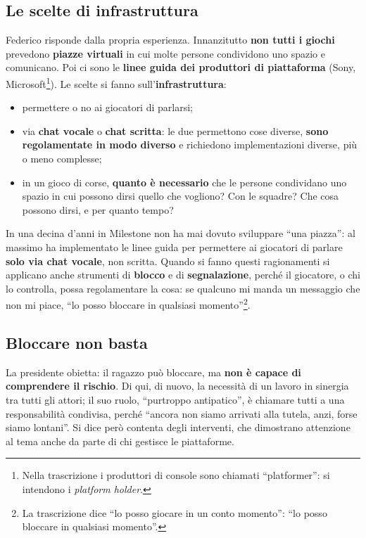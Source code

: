 \subsection{Le scelte di infrastruttura}

Federico risponde dalla propria esperienza. Innanzitutto \textbf{non tutti i
giochi} prevedono \textbf{piazze virtuali} in cui molte persone condividono uno
spazio e comunicano. Poi ci sono le \textbf{linee guida dei produttori di
piattaforma} (Sony, Microsoft\footnote{Nella trascrizione i produttori di
console sono chiamati ``platformer'': si intendono i \emph{platform holder}.}).
Le scelte si fanno sull'\textbf{infrastruttura}:
\begin{itemize}
  \item permettere o no ai giocatori di parlarsi;
  \item via \textbf{chat vocale} o \textbf{chat scritta}: le due permettono cose
        diverse, \textbf{sono regolamentate in modo diverso} e richiedono
        implementazioni diverse, più o meno complesse;
  \item in un gioco di corse, \textbf{quanto è necessario} che le persone
        condividano uno spazio in cui possono dirsi quello che vogliono? Con le
        squadre? Che cosa possono dirsi, e per quanto tempo?
\end{itemize}
In una decina d'anni in Milestone non ha mai dovuto sviluppare ``una piazza'':
al massimo ha implementato le linee guida per permettere ai giocatori di
parlare \textbf{solo via chat vocale}, non scritta. Quando si fanno questi
ragionamenti si applicano anche strumenti di \textbf{blocco} e di
\textbf{segnalazione}, perché il giocatore, o chi lo controlla, possa
regolamentare la cosa: se qualcuno mi manda un messaggio che non mi piace,
``lo posso bloccare in qualsiasi momento''\footnote{La trascrizione dice ``lo
posso giocare in un conto momento'': ``lo posso bloccare in qualsiasi
momento''.}.

\subsection{Bloccare non basta}

La presidente obietta: il ragazzo può bloccare, ma \textbf{non è capace di
comprendere il rischio}. Di qui, di nuovo, la necessità di un lavoro in sinergia
tra tutti gli attori; il suo ruolo, ``purtroppo antipatico'', è chiamare tutti a
una responsabilità condivisa, perché ``ancora non siamo arrivati alla tutela,
anzi, forse siamo lontani''. Si dice però contenta degli interventi, che
dimostrano attenzione al tema anche da parte di chi gestisce le piattaforme.

